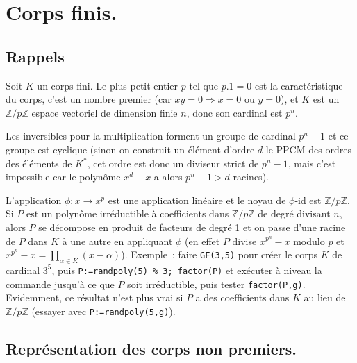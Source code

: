 \documentclass[a4paper,11pt]{article}
\newcommand{\Z}{{\mathbb{Z}}}
\begin{document}
\section{Corps finis.} \label{sec:gf}
\subsection{Rappels}
Soit $K$ un corps fini. Le plus petit entier $p$ tel que
$p.1=0$ est la caract\'eristique du corps, c'est un nombre premier
(car $xy=0 \Rightarrow x=0$ ou $y=0$), et $K$ est un $\Z/p\Z$
espace vectoriel de dimension finie $n$, donc son cardinal est $p^n$.

Les inversibles pour la multiplication forment un groupe de cardinal
$p^n-1$ et ce groupe est cyclique (sinon on construit un \'el\'ement
d'ordre $d$ le PPCM des ordres des \'el\'ements de $K^*$, cet ordre
est donc un diviseur strict de $p^n-1$, mais c'est impossible car
le polyn\^ome $x^d-x$ a alors $p^n-1>d$ racines).

L'application $\phi:x \rightarrow x^p$ est une application lin\'eaire
et le noyau de $\phi$-id est $\Z/p\Z$. Si $P$ est un polyn\^ome 
irr\'eductible \`a coefficients dans $\Z/p\Z$ de degr\'e divisant $n$, alors
$P$ se d\'ecompose en produit de facteurs de degr\'e 1 et on passe
d'une racine de $P$ dans $K$ \`a une autre en appliquant $\phi$
(en effet $P$ divise $x^{p^n}-x$ modulo $p$ et
$x^{p^n}-x=\prod_{\alpha \in K} (x-\alpha)$).
Exemple~: faire \verb|GF(3,5)| pour cr\'eer le corps $K$
de cardinal $3^5$, puis 
\verb|P:=randpoly(5) % 3; factor(P)|
et ex\'ecuter \`a niveau la commande jusqu'\`a ce que $P$ soit
irr\'eductible, puis tester \verb|factor(P,g)|.
Evidemment, ce r\'esultat n'est plus vrai si $P$ a des coefficients
dans $K$ au lieu de $\Z/p\Z$ (essayer avec \verb|P:=randpoly(5,g)|).

\subsection{Repr\'esentation des corps non premiers.}
\end{document}
